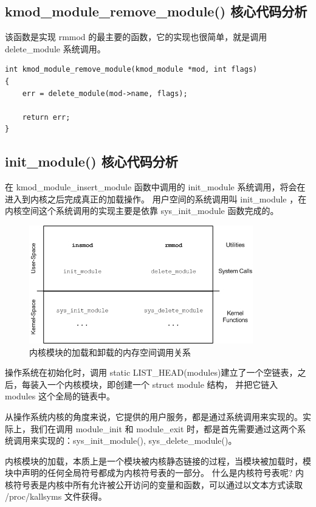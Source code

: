 \subsection{kmod\_module\_remove\_module() 核心代码分析}

该函数是实现 rmmod 的最主要的函数，它的实现也很简单，就是调用
delete\_module 系统调用。

{\begin{shaded}\begin{verbatim}
int kmod_module_remove_module(kmod_module *mod, int flags)
{
    err = delete_module(mod->name, flags);

    return err;
}
\end{verbatim}\end{shaded}}
\subsection{init\_module() 核心代码分析}

在 kmod\_module\_insert\_module 函数中调用的 init\_module
系统调用，将会在进入到内核之后完成真正的加载操作。 用户空间的系统调用叫
init\_module ，在内核空间这个系统调用的实现主要是依靠 sys\_init\_module
函数完成的。

\begin{figure}[htbp]
\centering
\includegraphics{./figures/user_sys_module.jpg}
\caption{内核模块的加载和卸载的内存空间调用关系}
\end{figure}

操作系统在初始化时，调用 static
LIST\_HEAD(modules)建立了一个空链表，之后，每装入一个内核模块，即创建一个
struct module 结构， 并把它链入 modules 这个全局的链表中。

从操作系统内核的角度来说，它提供的用户服务，都是通过系统调用来实现的。实际上，我们在调用
module\_init 和 module\_exit
时，都是首先需要通过这两个系统调用来实现的：sys\_init\_module(),
sys\_delete\_module()。

内核模块的加载，本质上是一个模块被内核静态链接的过程，当模块被加载时，模块中声明的任何全局符号都成为内核符号表的一部分。
什么是内核符号表呢?
内核符号表是内核中所有允许被公开访问的变量和函数，可以通过以文本方式读取
/proc/kallsyms 文件获得。

